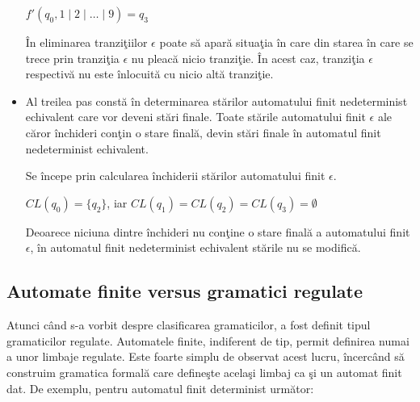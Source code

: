\begin{itemize}
$ f'(q_0, 1\mid2\mid\dots\mid9) = q_3 $

\begin{figure}[H]
\centering
{}
\end{figure}

În eliminarea tranziţiilor $\epsilon$ poate să apară situaţia în care din starea în care se trece prin tranziţia $\epsilon$ nu pleacă nicio tranziţie. În acest caz, tranziţia $\epsilon$ respectivă nu este înlocuită cu nicio altă tranziţie.
\item
Al treilea pas constă în determinarea stărilor automatului finit nedeterminist echivalent care vor deveni stări finale. Toate stările automatului finit $\epsilon$ ale căror închideri conţin o stare finală, devin stări finale în automatul finit nedeterminist echivalent.

Se începe prin calcularea închiderii stărilor automatului finit $\epsilon$.

$ CL(q_0) = \{ q_2 \} $, iar $ CL(q_1) = CL(q_2) = CL(q_3) = \emptyset $

Deoarece niciuna dintre închideri nu conţine o stare finală a automatului finit $\epsilon$, în automatul finit nedeterminist echivalent stările nu se modifică.
\end{itemize}

\subsection{Automate finite versus gramatici regulate}

Atunci când s-a vorbit despre clasificarea gramaticilor, a fost definit tipul gramaticilor regulate. Automatele finite, indiferent de tip, permit definirea numai a unor limbaje regulate. Este foarte simplu de observat acest lucru, încercând să construim gramatica formală care defineşte acelaşi limbaj ca şi un automat finit dat. De exemplu, pentru automatul finit determinist următor:

